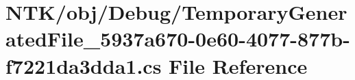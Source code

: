 \hypertarget{_temporary_generated_file__5937a670-0e60-4077-877b-f7221da3dda1_8cs}{}\section{N\+T\+K/obj/\+Debug/\+Temporary\+Generated\+File\+\_\+5937a670-\/0e60-\/4077-\/877b-\/f7221da3dda1.cs File Reference}
\label{_temporary_generated_file__5937a670-0e60-4077-877b-f7221da3dda1_8cs}
